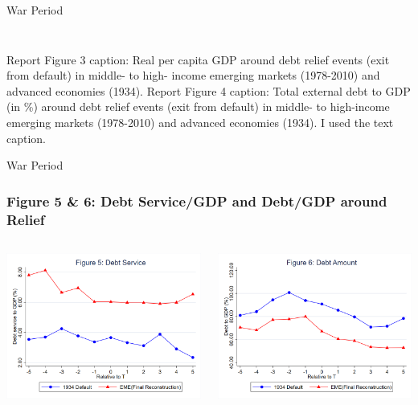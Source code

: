 \documentclass{beamer}
\begin{document}
\begin{frame}{War Period}
\begin{columns}
\begin{column}{0.5\textwidth}
      \label{fig:4_slide}
    \end{column}
  \end{columns}
  \vspace{0.5cm}
  \tiny Report Figure 3 caption: Real per capita GDP around debt relief events (exit from default) in middle- to high- income emerging markets (1978-2010) and advanced economies (1934).
  Report Figure 4 caption: Total external debt to GDP (in \%) around debt relief events (exit from default) in middle- to high-income emerging markets (1978-2010) and advanced economies (1934).
  I used the text caption.
\end{frame}

\begin{frame}{War Period}
  \frametitle{Figure 5 \& 6: Debt Service/GDP and Debt/GDP around Relief}
    \begin{columns}
    \begin{column}{0.5\textwidth}
      \centering
      \includegraphics[width=0.9\linewidth]{figures/Figure5_DebtService_Comparison.png}
      \label{fig:5_slide}
    \end{column}
    \begin{column}{0.5\textwidth}
      \centering
      \includegraphics[width=0.9\linewidth]{figures/Figure6_DebtStock_Comparison.png}

\end{column}
\end{columns}
\end{frame}
\end{document}
